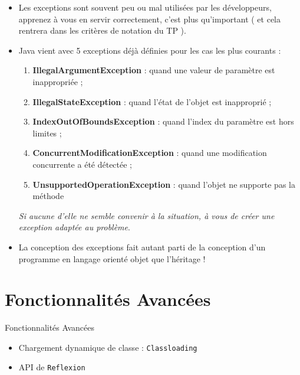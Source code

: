 \documentclass[handout]{beamer}
\begin{document}
\begin{frame}
	\begin{itemize}
		\item Les exceptions sont souvent peu ou mal utilisées par les développeurs, apprenez à vous en servir correctement, c'est plus qu'important ( et cela rentrera dans les critères de notation du TP ).
		\item Java vient avec 5 exceptions déjà définies pour les cas les plus courants :
			\begin{enumerate}
				\item \textbf{IllegalArgumentException} : quand une valeur de paramètre est inappropriée ;
				\item \textbf{IllegalStateException} : quand l'état de l'objet est inapproprié ;
				\item \textbf{IndexOutOfBoundsException} : quand l'index du paramètre est hors limites ;
				\item \textbf{ConcurrentModificationException} : quand une modification concurrente a été détectée ;
				\item \textbf{UnsupportedOperationException} : quand l'objet ne supporte pas la méthode 
			\end{enumerate}
			\textit{Si aucune d'elle ne semble convenir à la situation, à vous de créer une exception adaptée au problème}.
		\item La conception des exceptions fait autant parti de la conception d'un programme en langage orienté objet que l'héritage !
	\end{itemize}
\end{frame}

\section{Fonctionnalités Avancées}
\begin{frame}
	\begin{block}{Fonctionnalités Avancées}
		\begin{itemize}
			\item Chargement dynamique de classe : \texttt{Classloading}
			\item API de \texttt{Reflexion}
		\end{itemize}
	\end{block}
\end{frame}
\end{document}
